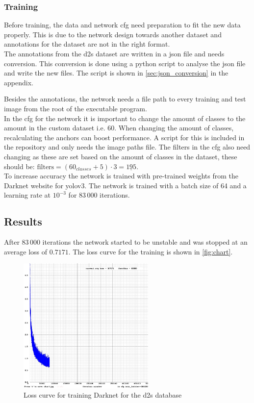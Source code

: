 \subsubsection{Training}
Before training, the data and network cfg need preparation to fit the new data properly. This is due to the network design towards another dataset and annotations for the dataset are not in the right format.\\

The annotations from the \gls{d2s} dataset are written in a json file and needs conversion. This conversion is done using a python script to analyse the json file and write the new files. The script is shown in \autoref{sec:json_conversion} in the appendix.

Besides the annotations, the network needs a file path to every training and test image from the root of the executable program.\\

In the cfg for the network it is important to change the amount of classes to the amount in the custom dataset i.e. 60. When changing the amount of classes, recalculating the anchors can boost performance. A script for this is included in the repository and only needs the image paths file.
The filters in the cfg also need changing as these are set based on the amount of classes in the dataset, these should be: $\text{filters} = (60_{classes} + 5) \cdot 3 = \underline{195}$.\\

To increase accuracy the network is trained with pre-trained weights from the Darknet website for \gls{yolo}v3. The network is trained with a batch size of 64 and a learning rate at $10^{-3}$ for $83\,000$ iterations.

\subsection{Results}
After $83\,000$ iterations the network started to be unstable and was stopped at an average loss of $ 0.7171 $. The loss curve for the training is shown in \autoref{fig:chart}.

\begin{figure}[H]
	\centering
	\includegraphics[width=0.6\textwidth]{figures/chart}
	\caption{Loss curve for training Darknet for the \gls{d2s} database}
	\label{fig:chart}
\end{figure}

